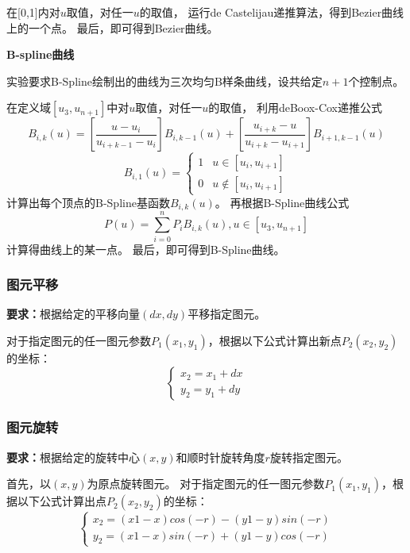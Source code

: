 \documentclass[a4paper,UTF8]{article}
\theoremstyle{definition}
\begin{document}
在[0,1]内对$u$取值，对任一$u$的取值，
运行de Castelijau递推算法，得到Bezier曲线上的一个点。
最后，即可得到Bezier曲线。

\textbf{B-spline曲线}

实验要求B-Spline绘制出的曲线为三次均匀B样条曲线，设共给定$n+1$个控制点。

在定义域$[u_3,u_{n+1}]$中对$u$取值，对任一$u$的取值，
利用deBoox-Cox递推公式
\begin{equation*}
    B_{i,k}(u)
    =[\frac{u-u_i}{u_{i+k-1}-u_i}]B_{i,k-1}(u)
    +[\frac{u_{i+k}-u}{u_{i+k}-u_{i+1}}]B_{i+1,k-1}(u)
\end{equation*}
\begin{equation*}
    B_{i,1}(u)=
    \begin{cases}
    1 & u\in[u_i,u_{i+1}]\\
    0 & u\not\in[u_i,u_{i+1}]
    \end{cases}
\end{equation*}
计算出每个顶点的B-Spline基函数$B_{i,k}(u)$。
再根据B-Spline曲线公式
\begin{equation*}
    P(u)=\sum_{i=0}^nP_iB_{i,k}(u),u\in[u_3,u_{n+1}]
\end{equation*}
计算得曲线上的某一点。
最后，即可得到B-Spline曲线。


\subsubsection{图元平移}
\textbf{要求：}根据给定的平移向量$(dx,dy)$平移指定图元。

对于指定图元的任一图元参数$P_1(x_1,y_1)$，根据以下公式计算出新点$P_2(x_2,y_2)$的坐标：
\begin{equation*}
    \begin{cases}
        x_2=x_1+dx\\
        y_2=y_1+dy
    \end{cases}
\end{equation*}


\subsubsection{图元旋转}
\textbf{要求：}根据给定的旋转中心$(x,y)$和顺时针旋转角度$r$旋转指定图元。

首先，以$(x,y)$为原点旋转图元。
对于指定图元的任一图元参数$P_1(x_1,y_1)$，根据以下公式计算出点$P_2(x_2,y_2)$的坐标：
\begin{equation*}
    \begin{cases}
        x_2=(x1-x)cos(-r)-(y1-y)sin(-r)\\
        y_2=(x1-x)sin(-r)+(y1-y)cos(-r)
    \end{cases}
\end{equation*}
\end{document}
